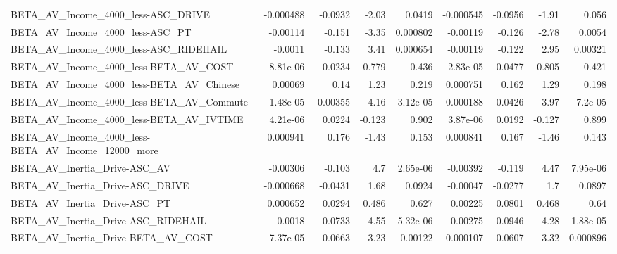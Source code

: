 \begin{tabular}{lrrrrrrrr}
BETA\_AV\_Income\_4000\_less-ASC\_DRIVE                 &   -0.000488 &      -0.0932 &    -2.03 &   0.0419 &  -0.000545 &     -0.0956 &        -1.91 &         0.056 \\
BETA\_AV\_Income\_4000\_less-ASC\_PT                    &    -0.00114 &       -0.151 &    -3.35 & 0.000802 &   -0.00119 &      -0.126 &        -2.78 &        0.0054 \\
BETA\_AV\_Income\_4000\_less-ASC\_RIDEHAIL              &     -0.0011 &       -0.133 &     3.41 & 0.000654 &   -0.00119 &      -0.122 &         2.95 &       0.00321 \\
BETA\_AV\_Income\_4000\_less-BETA\_AV\_COST              &    8.81e-06 &       0.0234 &    0.779 &    0.436 &   2.83e-05 &      0.0477 &        0.805 &         0.421 \\
BETA\_AV\_Income\_4000\_less-BETA\_AV\_Chinese           &     0.00069 &         0.14 &     1.23 &    0.219 &   0.000751 &       0.162 &         1.29 &         0.198 \\
BETA\_AV\_Income\_4000\_less-BETA\_AV\_Commute           &   -1.48e-05 &     -0.00355 &    -4.16 & 3.12e-05 &  -0.000188 &     -0.0426 &        -3.97 &       7.2e-05 \\
BETA\_AV\_Income\_4000\_less-BETA\_AV\_IVTIME            &    4.21e-06 &       0.0224 &   -0.123 &    0.902 &   3.87e-06 &      0.0192 &       -0.127 &         0.899 \\
BETA\_AV\_Income\_4000\_less-BETA\_AV\_Income\_12000\_more &    0.000941 &        0.176 &    -1.43 &    0.153 &   0.000841 &       0.167 &        -1.46 &         0.143 \\
BETA\_AV\_Inertia\_Drive-ASC\_AV                       &    -0.00306 &       -0.103 &      4.7 & 2.65e-06 &   -0.00392 &      -0.119 &         4.47 &      7.95e-06 \\
BETA\_AV\_Inertia\_Drive-ASC\_DRIVE                    &   -0.000668 &      -0.0431 &     1.68 &   0.0924 &   -0.00047 &     -0.0277 &          1.7 &        0.0897 \\
BETA\_AV\_Inertia\_Drive-ASC\_PT                       &    0.000652 &       0.0294 &    0.486 &    0.627 &    0.00225 &      0.0801 &        0.468 &          0.64 \\
BETA\_AV\_Inertia\_Drive-ASC\_RIDEHAIL                 &     -0.0018 &      -0.0733 &     4.55 & 5.32e-06 &   -0.00275 &     -0.0946 &         4.28 &      1.88e-05 \\
BETA\_AV\_Inertia\_Drive-BETA\_AV\_COST                 &   -7.37e-05 &      -0.0663 &     3.23 &  0.00122 &  -0.000107 &     -0.0607 &         3.32 &      0.000896 \\

\end{tabular}
